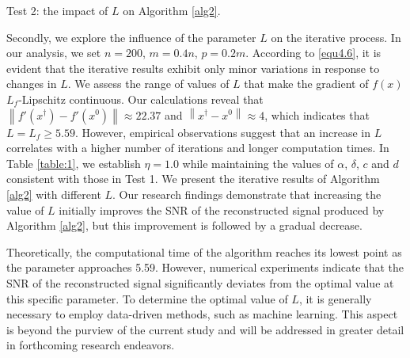 \documentclass[a4paper,12pt]{article}
\numberwithin{equation}{section}
\begin{document}
\par Test 2: the impact of $L$ on Algorithm \ref{alg2}.

\par Secondly, we explore the influence of the parameter $L$ on the iterative process. In our analysis, we set $n=200$, $m=0.4n$, $p=0.2m$. According to \eqref{equ4.6}, it is evident that the iterative results exhibit only minor variations in response to changes in $L$. We assess the range of values of $L$ that make the gradient of $f(x)$ $L_{f}$-Lipschitz continuous. Our calculations reveal that $\left\|f'\left(x^{\dagger}\right)-f'\left(x^{0}\right)\right\|\approx 22.37$ and $\left\|x^{\dagger}-x^{0}\right\|\approx 4$, which indicates that $L=L_{f}\geq 5.59$. However, empirical observations suggest that an increase in $L$ correlates with a higher number of iterations and longer computation times. In Table \ref{table:1}, we establish $\eta=1.0$ while maintaining the values of $\alpha$, $\delta$, $c$ and $d$ consistent with those in Test 1. We present the iterative results of Algorithm \ref{alg2} with different $L$. Our research findings demonstrate that increasing the value of $L$ initially improves the SNR of the reconstructed signal produced by Algorithm \ref{alg2}, but this improvement is followed by a gradual decrease. 

\par Theoretically, the computational time of the algorithm reaches its lowest point as the parameter approaches 5.59. However, numerical experiments indicate that the SNR of the reconstructed signal significantly deviates from the optimal value at this specific parameter. To determine the optimal value of $L$, it is generally necessary to employ data-driven methods, such as machine learning. This aspect is beyond the purview of the current study and will be addressed in greater detail in forthcoming research endeavors.

\begin{table}[H]
\caption{{\rm SNR} of reconstruction $x^{*}$ with different $L$ when $c=2$, $d=3$ and $\sigma=30$dB.}
\label{table:1}
\centering
\tabcolsep=0.35cm
\linewidth
{}
\end{table}
\end{document}

